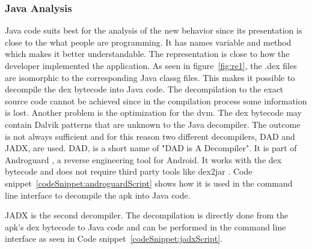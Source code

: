 \subsubsection{Java Analysis} \label{subsection:forensics-tools-java}
Java code suits best for the analysis of the new behavior since its presentation is close to the what people are programming.
It has names variable and method which makes it better understandable.
The representation is close to how the developer implemented the application.
\newline
As seen in figure~\ref{fig:re1}, the .dex files are isomorphic to the corresponding Java \gls{classg} files.
This makes it possible to decompile the dex bytecode into Java code.
The decompilation to the exact source code cannot be achieved since in the compilation process some information is lost.
Another problem is the optimization for the \gls{dvm}.
The dex bytecode may contain Dalvik patterns that are unknown to the Java decompiler.
The outcome is not always sufficient and for this reason two different decompilers, DAD and JADX, are used.
\newline
DAD, is a short name of "DAD is A Decompiler".
It is part of Androguard \cite{androguard}, a reverse engineering tool for Android.
It works with the dex bytecode and does not require third party tools like dex2jar \cite{dex2jar}.
Code snippet~\ref{codeSnippet:androguardScript} shows how it is used in the command line interface to decompile the \gls{apk} into Java code.
\newline

JADX \cite{jadx} is the second decompiler.
The decompilation is directly done from the \gls{apk}'s dex bytecode to Java code and can be performed in the command line interface as seen in Code snippet~\ref{codeSnippet:jadxScript}.

